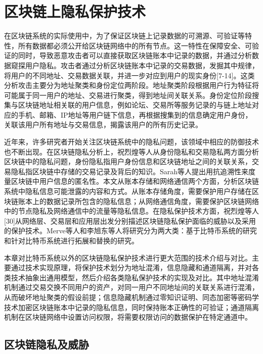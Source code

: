 
\chapter{区块链上隐私保护技术}

在区块链系统的实际使用中，为了保证区块链上记录数据的可溯源、可验证等特性，所有数据都必须公开给区块链网络中的所有节点。这一特性在保障安全、可验证的同时，导致恶意攻击者可以直接获取区块链账本中记录的数据，并通过分析数据窥探用户隐私。攻击者通过分析区块链账本中记录的交易数据，发掘其中规律，将用户的不同地址、交易数据关联，并进一步对应到用户的现实身份[7-14]。这类分析攻击主要分为地址聚类和身份定位两阶段。地址聚类阶段根据用户行为特征将可能属于同一用户的地址、交易进行聚类，得到地址间关联关系。身份定位阶段搜集与区块链地址相关联的用户信息，例如论坛、交易所等服务记录的与链上地址对应的手机、邮箱、IP地址等用户链下信息，再根据搜集到的信息确定用户身份，关联该用户所有地址与交易信息，揭露该用户的所有历史记录。

近年来，许多研究者开始关注区块链系统中的隐私问题，该领域中相应的防御技术也不断出现。在区块链隐私分析上，祝烈煌等人从身份隐私和交易隐私两方面分析区块链中的隐私问题，身份隐私指用户身份信息和区块链地址之间的关联关系，交易隐私指区块链中存储的交易记录及背后的知识。Sarah等人提出用抗追溯性来度量区块链中用户信息的匿名性。本文从账本存储和网络通信两个方面，分析区块链系统中隐私信息可能泄露的内容和方式。从账本存储角度，需要保护用户存储在区块链账本上的数据记录所包含的隐私信息；从网络通信角度，需要保护区块链网络中的节点隐私及网络通信中的流量等隐私信息。在隐私保护技术方面，祝烈煌等人[30]从网络层、交易层和应用层出发分别描述区块链隐私保护面临的威胁以及采用的保护技术。Merve等人和李旭东等人将研究分为两大类：基于比特币系统的研究和针对比特币系统进行拓展和替换的研究。

本章对比特币系统以外的区块链隐私保护技术进行更大范围的技术介绍与对比。主要通过技术实现原理，将保护技术划分为地址混淆，信息隐藏和通道隔离，并对各类技术抽象出通用模型，然后介绍各类隐私保护技术的实现及对比。其中地址混淆机制通过交易交换不同用户的资产，对同一用户不同地址间的关联关系进行混淆，从而破坏地址聚类的假设前提；信息隐藏机制通过零知识证明、同态加密等密码学技术加密区块链账本中记录的隐私信息，同时保持账本正确性的可验证；通道隔离机制在区块链网络中设置访问权限，将需要权限访问的数据保护在特定通道中。

\section{区块链隐私及威胁}

